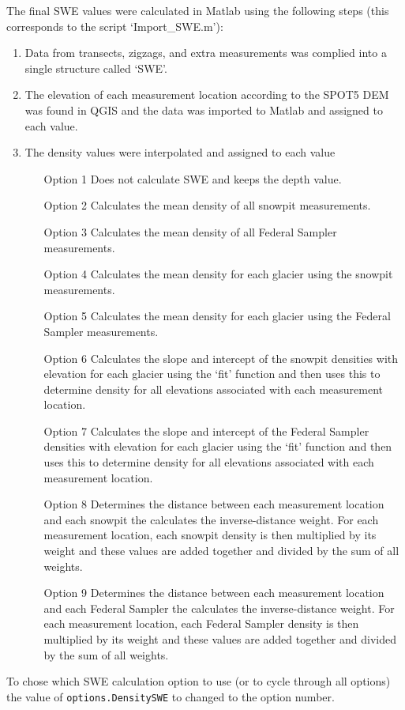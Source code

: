 \documentclass[12pt]{article}
\begin{document}
The final SWE values were calculated in Matlab using the following steps (this corresponds to the script `Import\_SWE.m'):
\begin{enumerate}
\item Data from transects, zigzags, and extra measurements was complied into a single structure called `SWE'.
\item The elevation of each measurement location according to the SPOT5 DEM was found in QGIS and the data was imported to Matlab and assigned to each value.
\item The density values were interpolated and assigned to each value
	\begin{itemize}
	\item[Option 1] Does not calculate SWE and keeps the depth value.
	\item[Option 2] Calculates the mean density of all snowpit measurements.
	\item[Option 3] Calculates the mean density of all Federal Sampler measurements.
	\item[Option 4] Calculates the mean density for each glacier using the snowpit measurements. 
	\item[Option 5] Calculates the mean density for each glacier using the Federal Sampler measurements. 
	\item[Option 6] Calculates the slope and intercept of the snowpit densities with elevation for each glacier using the `fit' function and then uses this to determine density for all elevations associated with each measurement location.
	\item[Option 7] Calculates the slope and intercept of the Federal Sampler densities with elevation for each glacier using the `fit' function and then uses this to determine density for all elevations associated with each measurement location.
	\item[Option 8] Determines the distance between each measurement location and each snowpit the calculates the inverse-distance weight. For each measurement location, each snowpit density is then multiplied by its weight and these values are added together and divided by the sum of all weights. 
	\item[Option 9] Determines the distance between each measurement location and each Federal Sampler the calculates the inverse-distance weight. For each measurement location, each Federal Sampler density is then multiplied by its weight and these values are added together and divided by the sum of all weights. 
	\end{itemize}
\end{enumerate}
To chose which SWE calculation option to use (or to cycle through all options) the value of \texttt{options.DensitySWE} to changed to the option number.
\end{document}
